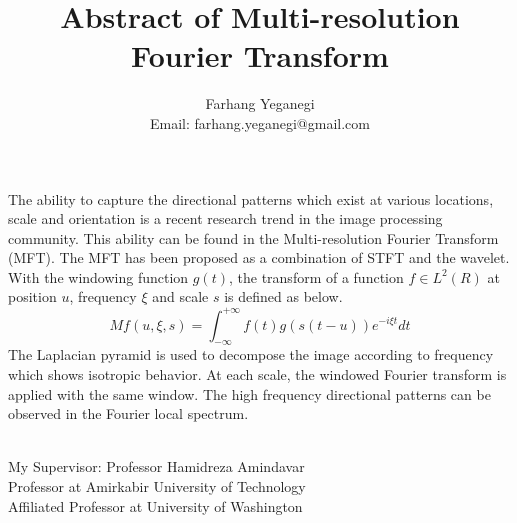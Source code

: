 \documentclass{article}
\title{Abstract of Multi-resolution Fourier Transform}
\date{}
\author{Farhang Yeganegi\\Email: farhang.yeganegi@gmail.com}
\begin{document}
\maketitle

The ability to capture the directional patterns which exist at various locations, scale and orientation is a recent research trend in the image processing community. This ability can be found in the Multi-resolution Fourier Transform (MFT). The MFT has been proposed as a combination of STFT and the wavelet. With the windowing function $g(t)$, the transform of a function $f\in L^2(R)$ at position $u$, frequency $\xi$ and scale $s$ is defined as below.
\begin{equation}
Mf(u,\xi,s) = \int_{-\infty}^{+\infty} f(t)g(s(t-u)) e^{-i\xi t} dt
\end{equation}
The Laplacian pyramid is used to decompose the image according to frequency which shows isotropic behavior. At each scale, the windowed Fourier transform is applied with the same window. The high frequency directional patterns can be observed in the Fourier local spectrum.\\
\\
\begin{center}
\large{My Supervisor: Professor Hamidreza Amindavar\\ Professor at Amirkabir University of Technology\\ Affiliated Professor at University of Washington}
\end{center}
\end{document}
